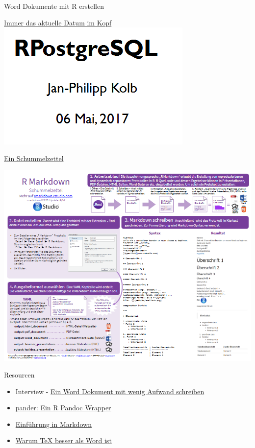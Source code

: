 \documentclass[ignorenonframetext,]{beamer}
\begin{document}
\begin{frame}[fragile]{Word Dokumente mit R erstellen}
\begin{block}{\href{http://stackoverflow.com/questions/23449319/yaml-current-date-in-rmarkdown}{Immer
das aktuelle Datum im Kopf}}
\includegraphics{./tex2pdf.9796/d0c85ca1742e1c3f37b4ed04abbb439f0b11ee08.png}

\end{block}

\begin{block}{\href{https://www.rstudio.com/wp-content/uploads/2015/06/rmarkdown-german.pdf}{Ein
Schummelzettel}}

\includegraphics{./tex2pdf.9796/dd7920db4654ba118987d112b41c661a5cc57a14.png}

\end{block}

\begin{block}{Resourcen}

\begin{itemize}
\item
  Interview -
  \href{https://www.r-statistics.com/2013/03/write-ms-word-document-using-r-with-as-little-overhead-as-possible/}{Ein
  Word Dokument mit wenig Aufwand schreiben}
\item
  \href{http://rapporter.github.io/pander/}{pander: Ein R Pandoc
  Wrapper}
\item
  \href{https://github.com/ctreffe/r-space/wiki/R-Markdown-Intro}{Einführung
  in Markdown}
\item
  \href{http://factorgrad.blogspot.de/2010/07/why-latex-is-superior-to-ms-word.html}{Warum
  TeX besser als Word ist}
\end{itemize}


\end{block}
\end{frame}
\end{document}
